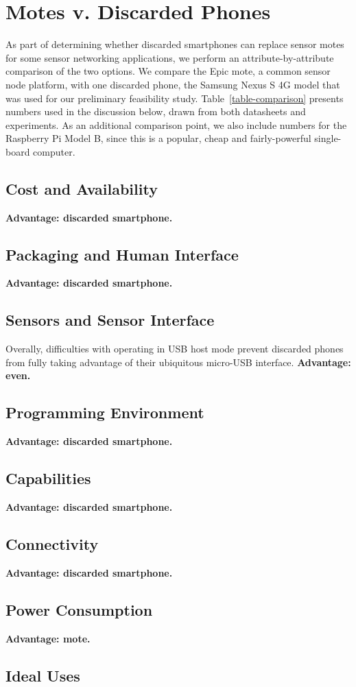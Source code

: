 \section{Motes v. Discarded Phones}
\label{sec-comparison}



As part of determining whether discarded smartphones can replace sensor motes
for some sensor networking applications, we perform an attribute-by-attribute
comparison of the two options. We compare the Epic mote, a common sensor node
platform, with one discarded phone, the Samsung Nexus S 4G model that was
used for our preliminary feasibility study. Table~\ref{table-comparison}
presents numbers used in the discussion below, drawn from both datasheets and
experiments. As an additional comparison point, we also include numbers for
the Raspberry Pi Model B, since this is a popular, cheap and fairly-powerful
single-board computer.

\subsection{Cost and Availability}

\textbf{Advantage: discarded smartphone.}

\subsection{Packaging and Human Interface}

\textbf{Advantage: discarded smartphone.}

\subsection{Sensors and Sensor Interface}

Overally, difficulties with operating in USB host mode prevent discarded
phones from fully taking advantage of their ubiquitous micro-USB interface.
\textbf{Advantage: even.}

\subsection{Programming Environment}

\textbf{Advantage: discarded smartphone.}

\subsection{Capabilities}

\textbf{Advantage: discarded smartphone.}

\subsection{Connectivity}

\textbf{Advantage: discarded smartphone.}

\subsection{Power Consumption}

\textbf{Advantage: mote.}

\subsection{Ideal Uses}
